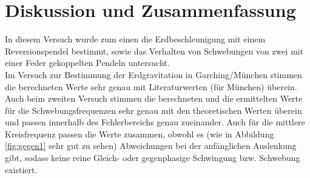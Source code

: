 \section{Diskussion und Zusammenfassung}
In diesem Versuch wurde zum einen die Erdbeschleunigung mit einem Reversionspendel bestimmt, sowie das Verhalten von Schwebungen von zwei mit einer Feder gekoppelten Pendeln untersucht.\\
Im Versuch zur Bestimmung der Erdgravitation in Garching/München stimmen die berechneten Werte sehr genau mit Literaturwerten (für München) überein. Auch beim zweiten Versuch stimmen die berechneten und die ermittelten Werte für die Schwebungsfrequenzen sehr genau mit den theoretischen Werten überein und passen innerhalb des Fehlerbereichs genau zueinander. Auch für die mittlere Kreisfrequenz passen die Werte zusammen, obwohl es (wie in Abbildung \ref{fig:gegen1} sehr gut zu sehen) Abweichungen bei der anfänglichen Auslenkung gibt, sodass keine reine Gleich- oder gegenphasige Schwingung bzw. Schwebung existiert.